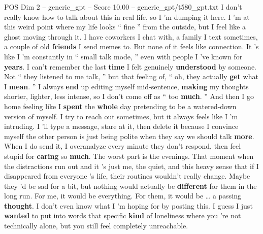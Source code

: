 \begin{textsample}{POS Dim 2 – generic\_gpt – Score 10.00 – generic\_gpt/t580\_gpt.txt}  \label{ex:f2_pos_040}
I don't really know how to talk about this in real life, so I ’m dumping it here.
I ’m at this weird point where my life looks “ fine ” from the outside, but I feel like a ghost moving through it.
I have coworkers I chat with, a family I text sometimes, a couple of old \textbf{friends} I send memes to.
But none of it feels like connection.
It ’s like I ’m constantly in “ small talk mode, ” even with people I ’ve known for \textbf{years}.
I can't remember the last \textbf{time} I felt genuinely \textbf{understood} by someone.
Not “ they listened to me talk, ” but that feeling of, “ oh, they actually \textbf{get} what I \textbf{mean}. ” I always \textbf{end} up editing myself mid-sentence, \textbf{making} my thoughts shorter, lighter, less intense, so I don't come off as “ too \textbf{much}. ” And then I go home feeling like I \textbf{spent} the \textbf{whole} day pretending to be a watered-down version of myself.
I try to reach out sometimes, but it always feels like I ’m intruding.
I ’ll type a message, stare at it, then delete it because I convince myself the other person is just being polite when they say we should talk \textbf{more}.
When I do send it, I overanalyze every minute they don't respond, then feel stupid for \textbf{caring} so \textbf{much}.
The worst part is the evenings.
That moment when the distractions run out and it ’s just me, the quiet, and this heavy sense that if I disappeared from everyone ’s life, their routines wouldn't really change.
Maybe they ’d be sad for a bit, but nothing would actually be \textbf{different} for them in the long run.
For me, it would be everything.
For them, it would be … a passing \textbf{thought}.
I don't even know what I ’m hoping for by posting this.
I guess I just \textbf{wanted} to put into words that specific \textbf{kind} of loneliness where you ’re not technically alone, but you still feel completely unreachable.

\end{textsample}
